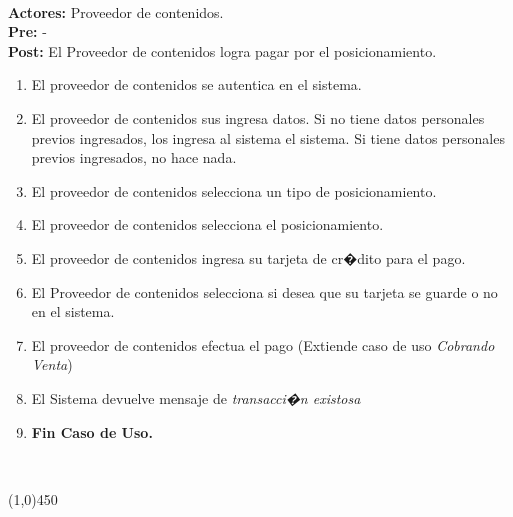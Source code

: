 \documentclass[11pt, a4paper, spanish]{article}
\begin{document}
{ \\ \textbf{Actores: } Proveedor de contenidos. \\ \textbf{Pre:} - \\ \textbf{Post:}
El Proveedor de contenidos logra pagar por el posicionamiento.\\  \begin{enumerate} \item El proveedor de contenidos se autentica en el sistema. \item El proveedor de contenidos sus ingresa datos. Si no tiene datos personales previos ingresados, los ingresa al sistema el sistema. Si tiene datos personales previos ingresados, no hace nada. \item El proveedor de contenidos selecciona un tipo de posicionamiento. \item El proveedor de contenidos selecciona el posicionamiento. \item El proveedor de contenidos ingresa su tarjeta de cr�dito para el pago. \item El Proveedor de contenidos selecciona si desea que su tarjeta se guarde o no en el sistema. \item El proveedor de contenidos efectua el pago (Extiende caso de uso \emph{Cobrando Venta}) \item El Sistema devuelve mensaje de \emph{transacci�n existosa} \item \textbf{Fin Caso de Uso.} \end{enumerate}  \\  \begin{center} \line(1,0){450} \end{center}

}
\end{document}
